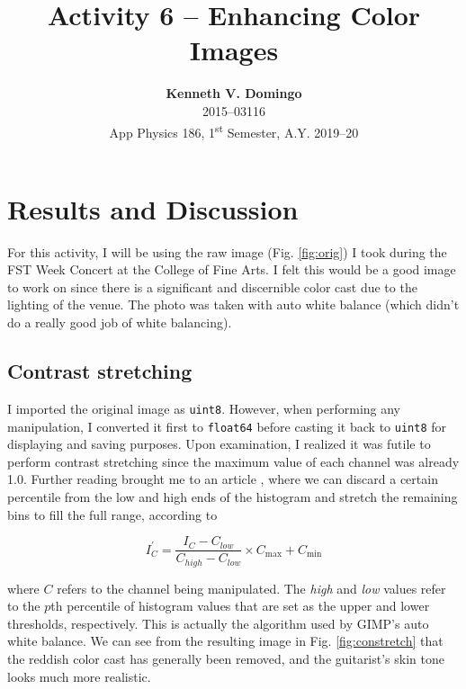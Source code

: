 \documentclass[12pt,a4paper]{article}
\newcommand{\activity}{Activity 6 -- Enhancing Color Images}
\begin{document}
\title{\TitleFont \activity}
\author[ ]{\textbf{Kenneth V. Domingo} \\
2015--03116 \\
App Physics 186, 1\textsuperscript{st} Semester, A.Y. 2019--20}

\maketitle
\thispagestyle{titlestyle}

\section*{Results and Discussion}
\setcounter{section}{1}

For this activity, I will be using the raw image (Fig. \ref{fig:orig}) I took during the FST Week Concert at the College of Fine Arts. I felt this would be a good image to work on since there is a significant and discernible color cast due to the lighting of the venue. The photo was taken with auto white balance (which didn't do a really good job of white balancing).

\subsection{Contrast stretching}
I imported the original image as \texttt{uint8}. However, when performing any manipulation, I converted it first to \texttt{float64} before casting it back to \texttt{uint8} for displaying and saving purposes. Upon examination, I realized it was futile to perform contrast stretching since the maximum value of each channel was already 1.0. Further reading brought me to an article \cite{constretch}, where we can discard a certain percentile from the low and high ends of the histogram and stretch the remaining bins to fill the full range, according to

\begin{equation}\label{eq:constretch}
	I_C^\prime = \frac{I_C - C_{low}}{C_{high} - C_{low}} \times C_{\max} + C_{\min}
\end{equation}

\noindent
where $C$ refers to the channel being manipulated. The \textit{high} and \textit{low} values refer to the $p$th percentile of histogram values that are set as the upper and lower thresholds, respectively. This is actually the algorithm used by GIMP's auto white balance. We can see from the resulting image in Fig. \ref{fig:constretch} that the reddish color cast has generally been removed, and the guitarist's skin tone looks much more realistic.
\end{document}

